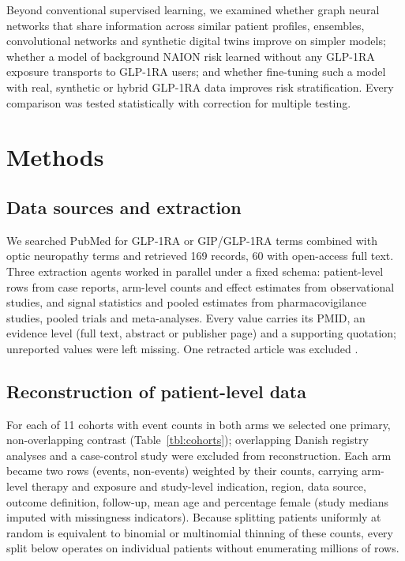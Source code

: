 \documentclass[journal]{IEEEtran}
\begin{document}
Beyond conventional supervised learning, we examined whether graph
neural networks that share information across similar patient profiles,
ensembles, convolutional networks and synthetic digital twins improve on
simpler models; whether a model of background NAION risk learned without
any GLP-1RA exposure transports to GLP-1RA users; and whether
fine-tuning such a model with real, synthetic or hybrid GLP-1RA data
improves risk stratification. Every comparison was tested statistically
with correction for multiple testing.

\section{Methods}\label{methods}

\subsection{Data sources and
extraction}\label{data-sources-and-extraction}

We searched PubMed for GLP-1RA or GIP/GLP-1RA terms combined with optic
neuropathy terms and retrieved 169 records, 60 with open-access full
text. Three extraction agents worked in parallel under a fixed schema:
patient-level rows from case reports, arm-level counts and effect
estimates from observational studies, and signal statistics and pooled
estimates from pharmacovigilance studies, pooled trials and
meta-analyses. Every value carries its PMID, an evidence level (full
text, abstract or publisher page) and a supporting quotation; unreported
values were left missing. One retracted article was excluded
\cite{p41144820, p42468029}.

\subsection{Reconstruction of patient-level
data}\label{reconstruction-of-patient-level-data}

For each of 11 cohorts with event counts in both arms we selected one
primary, non-overlapping contrast (Table~\ref{tbl:cohorts}); overlapping
Danish registry analyses and a case-control study were excluded from
reconstruction. Each arm became two rows (events, non-events) weighted
by their counts, carrying arm-level therapy and exposure and study-level
indication, region, data source, outcome definition, follow-up, mean age
and percentage female (study medians imputed with missingness
indicators). Because splitting patients uniformly at random is
equivalent to binomial or multinomial thinning of these counts, every
split below operates on individual patients without enumerating millions
of rows.
\end{document}
